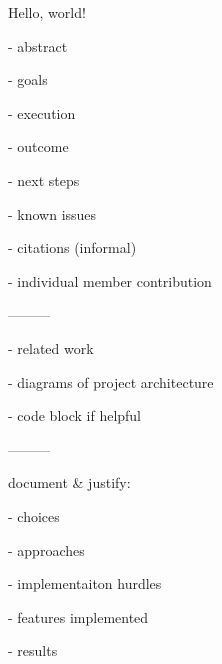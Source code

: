 \documentclass[11pt]{report}
\begin{document}
Hello, world!

- abstract

- goals

- execution

- outcome

- next steps

- known issues

- citations (informal)

- individual member contribution

---------

- related work

- diagrams of project architecture

- code block if helpful




---------


document \& justify:

- choices

- approaches

- implementaiton hurdles

- features implemented

- results
\end{document}
